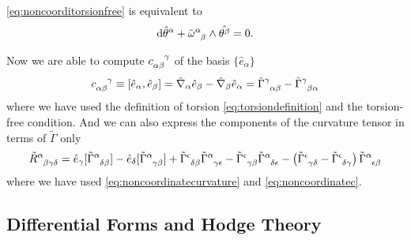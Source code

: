 \documentclass[10pt]{article}
\begin{document}
\eqref{eq:noncoorditorsionfree} is equivalent to 
\begin{align}
    \dd{\hat{\theta}^\alpha}+\tensor{\tilde{\omega}}{^\alpha_\beta}\wedge\hat{\theta^\beta}=0.
\end{align}

Now we are able to compute $\tensor{c}{_\alpha_\beta^\gamma}$ of the basis $\{\hat{e}_\alpha\}$
\begin{align}
    \tensor{c}{_\alpha_\beta^\gamma}\equiv\comm{\hat{e}_\alpha}{\hat{e}_\beta}=\hat{\nabla}_\alpha \hat{e}_\beta-\hat{\nabla}_\beta \hat{e}_\alpha=\tensor{\tilde{\Gamma}}{^\gamma_\alpha_\beta}-\tensor{\tilde{\Gamma}}{^\gamma_\beta_\alpha}\label{eq:noncoordinatec}
\end{align}
where we have used the definition of torsion \eqref{eq:torsiondefinition} and the torsion-free condition.
And we can also express the components of the curvature tensor in terms of $\tilde{\Gamma}$ only 
\begin{align}
    \tensor{\tilde{R}}{^\alpha_\beta_\gamma_\delta}=\hat{e}_\gamma[\tensor{\tilde{\Gamma}}{^\alpha_\delta_\beta}]-\hat{e}_\delta[\tensor{\tilde{\Gamma}}{^\alpha_\gamma_\beta}]+\tensor{\tilde{\Gamma}}{^\epsilon_\delta_\beta}\tensor{\tilde{\Gamma}}{^\alpha_\gamma_\epsilon}-\tensor{\tilde{\Gamma}}{^\epsilon_\gamma_\beta}\tensor{\tilde{\Gamma}}{^\alpha_\delta_\epsilon}-\left(\tensor{\tilde{\Gamma}}{^\epsilon_\gamma_\delta}-\tensor{\tilde{\Gamma}}{^\epsilon_\delta_\gamma}\right)\tensor{\tilde{\Gamma}}{^\alpha_\epsilon_\beta}
\end{align}
where we have used \eqref{eq:noncoordinatecurvature} and \eqref{eq:noncoordinatec}.

\subsection{Differential Forms and Hodge Theory}
\end{document}
